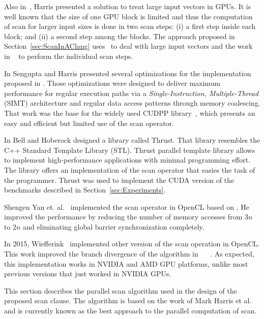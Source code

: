 \documentclass[Ingles]{ic-tese-v1}
\newcommand{\rsec}[1]{Section~\ref{sec:#1}}
\begin{document}
Also  in~\cite{harris2007parallel},  Harris  presented a  solution  to
treat large input vectors in GPUs.  It  is well known that the size of
one GPU block  is limited and thus the computation  of scan for larger
input sizes is  done in two scan  steps: (i) a first  step inside each
block; and (ii) a second step among the blocks.  The approach proposed
in  \rsec{ScanInAClang}  uses~\cite{harris2007parallel} to  deal  with
large input vectors and the work in ~\cite{ScanAsPrimitive} to perform
the individual scan steps.

In   \cite{Sengupta:2008}  Sengupta   and  Harris   presented  several
optimizations     for      the     implementation      proposed     in
\cite{harris2007parallel}.   Those  optimizations   were  designed  to
deliver  maximum  performance  for   regular  execution  paths  via  a
\textit{Single-Instruction,  Multiple-Thread} (SIMT)  architecture and
regular data access patterns through memory coalescing.  That work was
the  base  for  the  widely  used  CUDPP  library~\cite{CUDPP},  which
presents an easy and efficient but limited use of the scan operator.

In  \cite{Nathan:2011} Bell  and  Hoberock designed  a library  called
Thrust.   That library  resembles  the C++  Standard Template  Library
(STL).   Thrust  parallel   template  library   allows  to   implement
high-performance  applications with  minimal  programming effort.  The
library offers an implementation of the scan operator that easies the task of 
the programmer.  Thrust  was used  to implement  the CUDA version of the  
benchmarks described in \rsec{Experiments}. 

Shengen Yan et.  al.~\cite{Yan:2013}  implemented the scan operator in
OpenCL based on \cite{harris2007parallel},  He improved the performance
by  reducing the  number  of memory  accesses from  $3n$  to $2n$  and
eliminating global barrier synchronization completely.

In 2015, Wiefferink~\cite{ScanOpenCL} implemented other version of the
scan operation in OpenCL.  This work improved the branch divergence of
the  algorithm in  ~\cite{ScanAsPrimitive} ~\cite{harris2007parallel}.
As  expected,  this  implementation  works   in  NVIDIA  and  AMD  GPU
platforms, unlike  most previous versions  that just worked  in NVIDIA
GPUs.

This section describes the parallel  scan algorithm used in the design
of the  proposed scan clause.  The algorithm is  based on the  work of
Mark Harris et al.~\cite{Sengupta:2007} and  is currently known as the best
approach to the parallel computation of scan.
\end{document}

